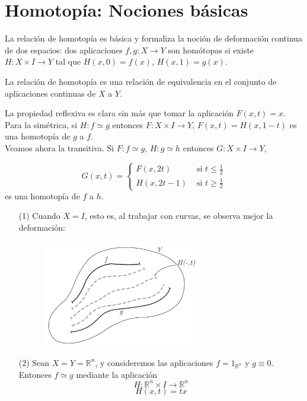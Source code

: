 \section{Homotopía: Nociones básicas}
La relación de homotopía es básica y formaliza la noción de deformación continua de dos espacios: dos aplicaciones $f, g : X\longrightarrow Y$ son homótopas si existe $H : X \times I \longrightarrow Y$ tal que $H(x, 0) = f(x)$, $H(x, 1) = g(x)$. 
\begin{prop}
La relación de homotopía es una relación de equivalencia en el conjunto de aplicaciones continuas de $X$ a $Y$.
\end{prop}
\begin{demo} 
La propiedad reflexiva es clara sin más que tomar la aplicación $F(x,t) = x$.\\
Para la simétrica, si $H : f \simeq g$ entonces $F : X \times I \longrightarrow Y$, $F(x, t) = H(x, 1-t)$ es una homotopía de $g$ a $f$.\\
Veamos ahora la transitiva. Si $F : f \simeq g$, $H : g \simeq h$ entonces $G : X \times I \longrightarrow Y$,

$$G(x, t) = 
\begin{cases}
	F(x, 2t) 	& 	\text{ si } t \leq \frac{1}{2}\\
	H(x, 2t - 1)& 	\text{ si } t \geq \frac{1}{2}
\end{cases}$$ 
es una homotopía de $f$ a $h$.
\end{demo}
\begin{ejems}
\begin{itemize}
\item[(1)] Cuando $X = I$, esto es, al trabajar con curvas, se observa mejor la deformación:
\begin{figure}[h]
\centering
\includegraphics[width=7cm]{images/pag8.pdf}
\end{figure}
\item[(2)] Sean $X = Y = \mathbb{R}^n$, y consideremos las aplicaciones $f = 1_{\mathbb{R}^n}$ y $g \equiv 0$. Entonces $f \simeq g$ mediante la aplicación
$$H : \mathbb{R}^n \times I \longrightarrow \mathbb{R}^n$$ $$H(x, t) = tx$$
\end{itemize}
\end{ejems}
